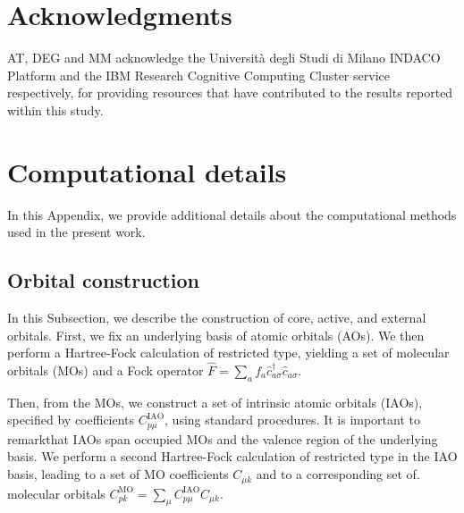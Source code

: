 \documentclass[aps,pra,twocolumn]{revtex4-2}
\newcommand{\crt}[1]{\hat{c}_{#1}^\dagger}
\newcommand{\dst}[1]{\hat{c}_{#1}^{\phantom{\dagger}}}
\begin{document}
\section*{Acknowledgments}

AT, DEG and MM acknowledge the Universit\`a degli Studi di Milano INDACO Platform and the IBM Research Cognitive Computing Cluster service respectively, 
for providing resources that have contributed to the results reported within this study.

\section{Computational details}

In this Appendix, we provide additional details about the computational methods used in the present work.

\subsection{Orbital construction}
\label{app:orbitals}

In this Subsection, we describe the construction of core, active, and external orbitals. First, we fix an underlying basis of atomic orbitals 
(AOs). We then perform a Hartree-Fock calculation of restricted type, yielding a set of molecular orbitals (MOs) and a Fock operator 
$\hat{F} = \sum_a f_a \crt{a\sigma} \dst{a\sigma}$.

Then, from the MOs, we construct a set of intrinsic atomic orbitals (IAOs), specified by coefficients $C^{\mathrm{IAO}}_{p\mu}$, using standard procedures. 
It is important to remarkthat IAOs span occupied MOs and the valence region of the underlying basis.
We perform a second Hartree-Fock calculation of restricted type in the IAO basis, leading to a set of MO coefficients $C_{\mu k}$
and to a corresponding set of. molecular orbitals $C^{\mathrm{MO}}_{pk} = \sum_{\mu} C^{\mathrm{IAO}}_{p\mu} C_{\mu k}$.
\end{document}
